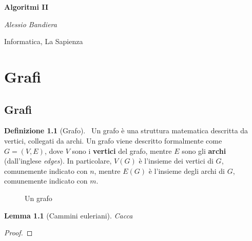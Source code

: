 \documentclass[14pt]{extreport}
\newtheorem{lemma}[theorem]{Lemma}
\theoremstyle{definition}
\newtheorem{definition}{Definizione}[section]
\theoremstyle{remark}
\begin{document}
\begin{titlepage}
    \centering
    \vspace*{1cm}

    \textbf{\huge Algoritmi II}

    \vspace{1.5cm}

    \textit{\Large Alessio Bandiera}

    \vfill
        
    \large Informatica, La Sapienza
\end{titlepage}

\tableofcontents

\pagebreak


\chapter{Grafi}

\section{Grafi}

\begin{definition}[Grafo]
\
    Un grafo è una struttura matematica descritta da vertici, collegati da archi. Un grafo viene descritto formalmente come $G=(V, E)$, dove $V$ sono i \textbf{vertici} del grafo, mentre $E$ sono gli \textbf{archi} (dall'inglese \textit{edges}). In particolare, $V(G)$ è l'insieme dei vertici di $G$, comunemente indicato con $n$, mentre $E(G)$ è l'insieme degli archi di $G$, comunemente indicato con $m$.
\end{definition}

\begin{figure}[h]
    \centering
    \caption{Un grafo}
\end{figure}

\begin{lemma}[Cammini euleriani]
    Cacca
\end{lemma}

\begin{proof}
\end{proof}

\pagebreak
\end{document}
